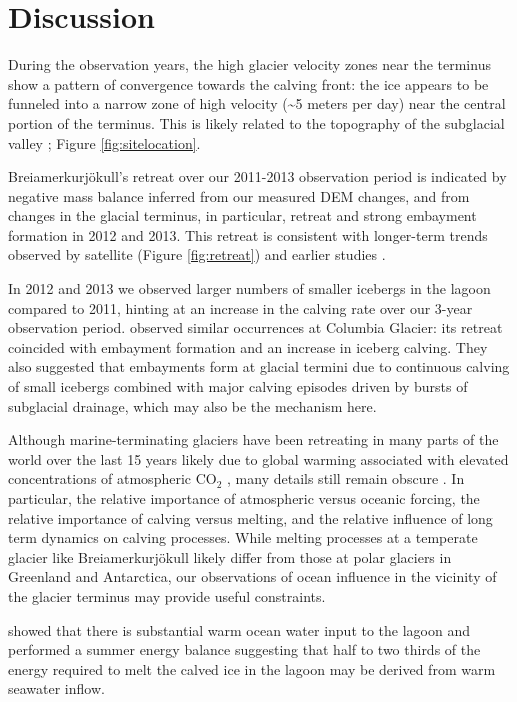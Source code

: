    





\section{Discussion}

During the observation years, the high glacier velocity zones near the terminus show a pattern of convergence towards the calving front: the ice appears to be funneled into a narrow zone of high velocity (\textasciitilde5 meters per day) near the central portion of the terminus. This is likely related to the topography of the subglacial valley \citep{bjornsson1996scales};  Figure \ref{fig:sitelocation}.

Brei{\dh}amerkurjökull's retreat over our 2011-2013 observation period is indicated by negative mass balance inferred from our measured DEM changes, and from changes in the glacial terminus, in particular, retreat and strong embayment formation in 2012 and 2013.  This retreat is consistent with longer-term trends observed by satellite (Figure \ref{fig:retreat}) and earlier studies \citep{bjornsson2001jokulsarlon}.

In 2012 and 2013 we observed larger numbers of smaller icebergs in the lagoon compared to 2011, hinting at an increase in the calving rate over our 3-year observation period. \citet*{sikonia1979columbia} observed similar occurrences at Columbia Glacier: its retreat coincided with embayment formation and an increase in iceberg calving. They also suggested that embayments form at glacial termini due to continuous calving of small icebergs combined with major calving episodes driven by bursts of subglacial drainage, which may also be the mechanism here.

Although marine-terminating glaciers have been retreating in many parts of the world over the last 15 years likely due to global warming associated with elevated concentrations of atmospheric $\mathrm{CO}_2$ \citep{ipcc}, many details still remain obscure \citep{joughin2012ice}. In particular, the relative importance of atmospheric versus oceanic forcing, the relative importance of calving versus melting, and the relative influence of long term dynamics on calving processes.  While melting processes at a temperate glacier like Brei{\dh}amerkurjökull likely differ from those at polar glaciers in Greenland and Antarctica, our observations of ocean influence in the vicinity of the glacier terminus may provide useful constraints.

\citet{bjornsson2001jokulsarlon} showed that there is substantial warm ocean water input to the lagoon and performed a summer energy balance suggesting that half to two thirds of the energy required to melt the calved ice in the lagoon may be derived from warm seawater inflow.

